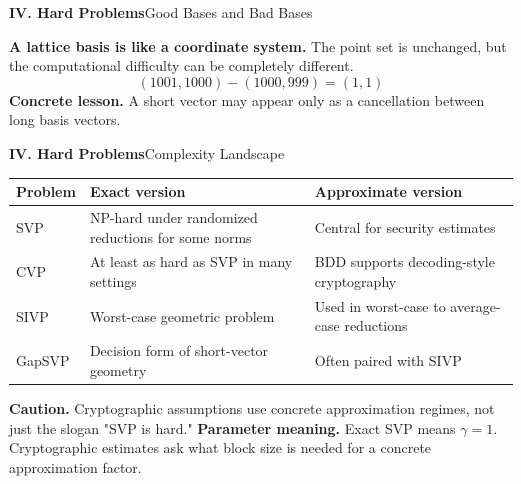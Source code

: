 \begin{frame}[shrink=5]{\textbf{IV. Hard Problems}}{Good Bases and Bad Bases}
\begin{center}
\end{center}
\vfill
\textbf{A lattice basis is like a coordinate system.} The point set is unchanged, but the computational difficulty can be completely different.
\[
  (1001,1000)-(1000,999)=(1,1)
\]
\textbf{Concrete lesson.}\; A short vector may appear only as a cancellation between long basis vectors.
\end{frame}

\begin{frame}[shrink=5]{\textbf{IV. Hard Problems}}{Complexity Landscape}
\begin{center}
\renewcommand{\arraystretch}{1.24}
\begin{tabular}{p{}p{}p{}}
\toprule
Problem & Exact version & Approximate version \\
\midrule
SVP & NP-hard under randomized reductions for some norms & Central for security estimates \\
CVP & At least as hard as SVP in many settings & BDD supports decoding-style cryptography \\
SIVP & Worst-case geometric problem & Used in worst-case to average-case reductions \\
GapSVP & Decision form of short-vector geometry & Often paired with SIVP \\
\bottomrule
\end{tabular}
\end{center}
\vspace{-.1cm}
\textbf{\color{red}Caution.}\; Cryptographic assumptions use concrete approximation regimes, not just the slogan "SVP is hard."
\textbf{Parameter meaning.}\; Exact SVP means $\gamma=1$.
Cryptographic estimates ask what block size is needed for a concrete approximation factor.
\end{frame}
